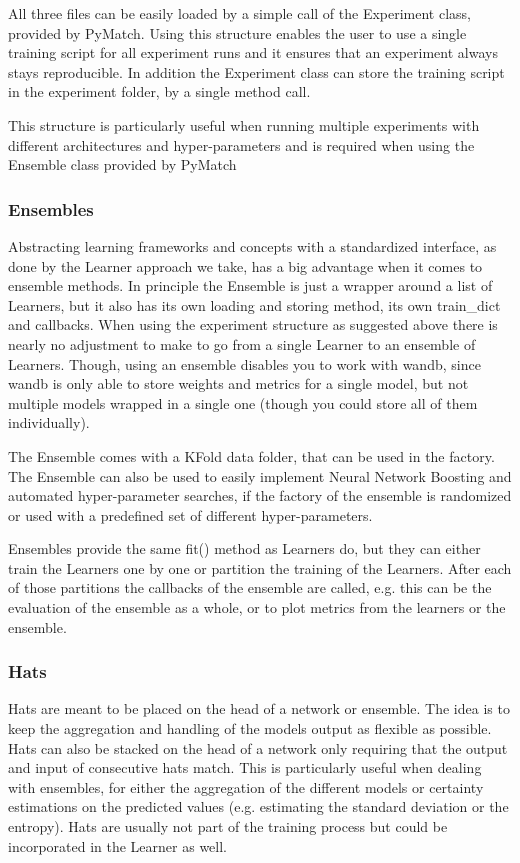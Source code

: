 \documentclass[11pt,a4paper]{article}
\begin{document}
	All three files can be easily loaded by a simple call of the Experiment class, provided by PyMatch.
	Using this structure enables the user to use a single training script for all experiment runs and it ensures that an experiment always stays reproducible.
	In addition the Experiment class can store the training script in the experiment folder, by a single method call.

	This structure is particularly useful when running multiple experiments with different architectures and hyper-parameters and is required when using the Ensemble class provided by PyMatch

	\subsubsection{Ensembles}
	Abstracting learning frameworks and concepts with a standardized interface, as done by the Learner approach we take, has a big advantage when it comes to ensemble methods.
	In principle the Ensemble is just a wrapper around a list of Learners, but it also has its own loading and storing method, its own train\_dict and callbacks.
	When using the experiment structure as suggested above there is nearly no adjustment to make to go from a single Learner to an ensemble of Learners.
	Though, using an ensemble disables you to work with wandb, since wandb is only able to store weights and metrics for a single model, but not multiple models wrapped in a single one (though you could store all of them individually).

	The Ensemble comes with a KFold data folder, that can be used in the factory.
	The Ensemble can also be used to easily implement Neural Network Boosting and automated hyper-parameter searches, if the factory of the ensemble is randomized or used with a predefined set of different hyper-parameters.

	Ensembles provide the same fit() method as Learners do, but they can either train the Learners one by one or partition the training of the Learners.
	After each of those partitions the callbacks of the ensemble are called, e.g. this can be the evaluation of the ensemble as a whole, or to plot metrics from the learners or the ensemble.

	\subsubsection{Hats}
	Hats are meant to be placed on the head of a network or ensemble.
	The idea is to keep the aggregation and handling of the models output as flexible as possible.
	Hats can also be stacked on the head of a network only requiring that the output and input of consecutive hats match.
	This is particularly useful when dealing with ensembles, for either the aggregation of the different models or certainty estimations on the predicted values (e.g. estimating the standard deviation or the entropy).
	Hats are usually not part of the training process but could be incorporated in the Learner as well.
	
\end{document}
